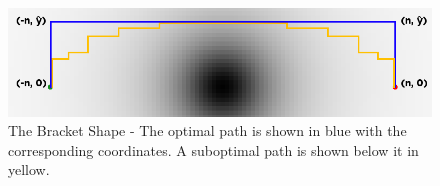 

\begin{figure}
\includegraphics[width=\columnwidth]{graphix/bracket.png}
\caption{The Bracket Shape - The optimal path is shown in blue with the corresponding coordinates. A suboptimal path is shown below it in yellow. }
\label{fig:bracket}
\end{figure}
